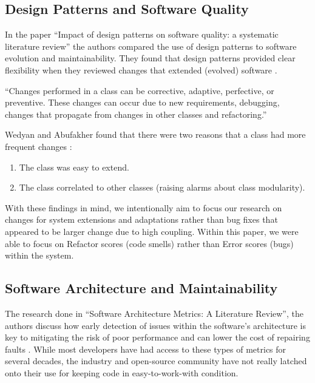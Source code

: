 \subsection{Design Patterns and Software Quality}

In the paper ``Impact of design patterns on software quality: a systematic literature review'' the authors compared the use of design patterns to software evolution and maintainability. They found that design patterns provided clear flexibility when they reviewed changes that extended (evolved) software \cite{wedyan:2020}.

\vspace{0.25cm}
\begin{displayquote}
``Changes performed in a class can be corrective, adaptive, perfective, or preventive. These changes can occur due to new requirements, debugging, changes that propagate from changes in other classes and refactoring.''
\end{displayquote}
\vspace{0.25cm}

Wedyan and Abufakher found that there were two reasons that a class had more frequent changes \cite{wedyan:2020}:

\vspace{0.25cm}
\begin{enumerate}
    \item The class was easy to extend.
    \item The class correlated to other classes (raising alarms about class modularity).
\end{enumerate}
\vspace{0.25cm}

With these findings in mind, we intentionally aim to focus our research on changes for system extensions and adaptations rather than bug fixes that appeared to be larger change due to high coupling. Within this paper, we were able to focus on Refactor scores (code smells) rather than Error scores (bugs) within the system.

\subsection{Software Architecture and Maintainability}

The research done in ``Software Architecture Metrics: A Literature Review'', the authors discuss how early detection of issues within the software's architecture is key to mitigating the risk of poor performance and can lower the cost of repairing faults \cite{coulin:2019}. While most developers have had access to these types of metrics for several decades, the industry and open-source community have not really latched onto their use for keeping code in easy-to-work-with condition.

